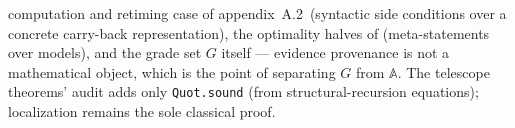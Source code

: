 computation and retiming case of appendix~A.2\ (syntactic
side
conditions over a concrete carry-back representation), the optimality
halves of  (meta-statements over models), and
the grade set $G$ itself --- evidence provenance is not a mathematical
object, which is the point of separating $G$ from $\mathbb{A}$. The
telescope theorems' audit adds only \texttt{Quot.sound} (from
structural-recursion equations); localization remains the sole
classical proof.
